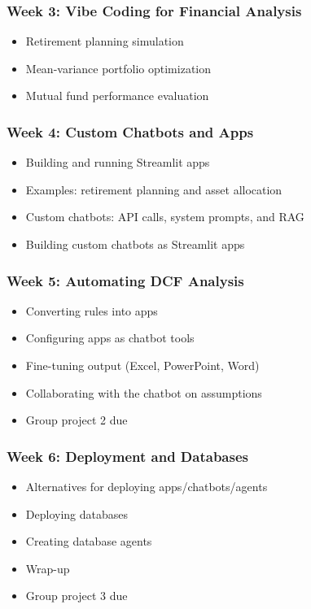 \documentclass[11pt]{article}
\begin{document}
\subsubsection*{Week 3: Vibe Coding for Financial Analysis}
\begin{itemize}\setlength{\itemsep}{0pt}
\item Retirement planning simulation
\item Mean-variance portfolio optimization
\item Mutual fund performance evaluation 
\end{itemize}

\subsubsection*{Week 4: Custom Chatbots and Apps}
\begin{itemize}\setlength{\itemsep}{0pt}
\item Building and running Streamlit apps
\item Examples: retirement planning and asset allocation
\item Custom chatbots: API calls, system prompts, and RAG
\item Building custom chatbots as Streamlit apps
\end{itemize}

\subsubsection*{Week 5: Automating DCF Analysis}
\begin{itemize}\setlength{\itemsep}{0pt}
\item Converting rules into apps
\item Configuring apps as chatbot tools
\item Fine-tuning output (Excel, PowerPoint, Word) 
\item Collaborating with the chatbot on assumptions
\item Group project 2 due
\end{itemize}

\subsubsection*{Week 6: Deployment and Databases}
\begin{itemize}\setlength{\itemsep}{0pt}
\item Alternatives for deploying apps/chatbots/agents
\item Deploying databases
\item Creating database agents
\item Wrap-up
\item Group project 3 due
\end{itemize}
\end{document}
